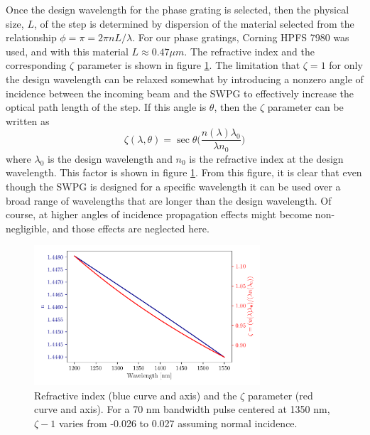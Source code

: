 Once the design wavelength for the phase grating is selected, then the physical size, $L$, of the step is determined by dispersion of the material selected from the relationship $\phi=\pi=2\pi n L/\lambda$.  For our phase gratings, Corning HPFS 7980 was used, and with this material $L\approx0.47\mu m$.  The refractive index and the corresponding $\zeta$ parameter is shown in figure \ref{fig:n_zeta}. The limitation that $\zeta=1$ for only the design wavelength can be relaxed somewhat by introducing a nonzero angle of incidence between the incoming beam and the SWPG to effectively increase the optical path length of the step.  If this angle is $\theta$, then the $\zeta$ parameter can be written as
\begin{equation}
\label{eqn:zeta_theta}
	\zeta(\lambda,\theta)=\sec\theta\bigg(  \frac{n(\lambda)\lambda_0}{\lambda n_0} \bigg)
\end{equation}
where $\lambda_0$ is the design wavelength and $n_0$ is the refractive index at the design wavelength.  This factor is shown in figure \ref{fig:n_zeta}.  From this figure, it is clear that even though the SWPG is designed for a specific wavelength it can be used over a broad range of wavelengths that are longer than the design wavelength. Of course, at higher angles of incidence propagation effects might become non-negligible, and those effects are neglected here. 
\begin{figure}
	\centering
	\includegraphics[width=0.75\textwidth]{figures/Two_source/n_zeta.pdf}
	\caption[Refractive index and $\zeta$ parameter characterizing $0-\zeta\pi$ SWPG]{Refractive index (blue curve and axis) and the $\zeta$ parameter (red curve and axis).  For a 70 nm bandwidth pulse centered at 1350 nm, $\zeta - 1$ varies from -0.026 to 0.027 assuming normal incidence.}
	\label{fig:n_zeta}
\end{figure}

